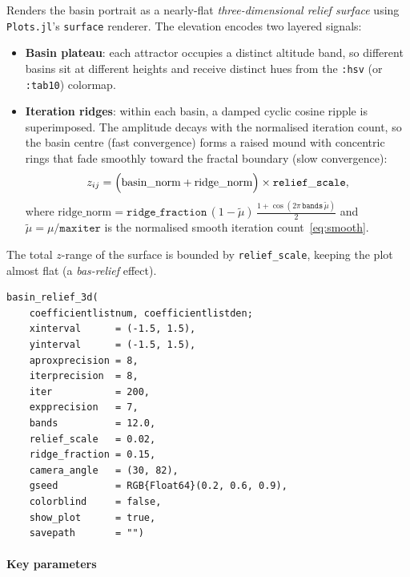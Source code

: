 \documentclass[11pt,a4paper]{article}
\theoremstyle{definition}
\newcommand{\pkg}[1]{\texttt{#1}}
\newcommand{\opt}[1]{\texttt{#1}}
\begin{document}
Renders the basin portrait as a nearly-flat \emph{three-dimensional relief
surface} using \pkg{Plots.jl}'s \texttt{surface} renderer.
The elevation encodes two layered signals:

\begin{itemize}[nosep]
  \item \textbf{Basin plateau}: each attractor occupies a distinct altitude
    band, so different basins sit at different heights and receive distinct
    hues from the \texttt{:hsv} (or \texttt{:tab10}) colormap.
  \item \textbf{Iteration ridges}: within each basin, a damped cyclic
    cosine ripple is superimposed.  The amplitude decays with the normalised
    iteration count, so the basin centre (fast convergence) forms a raised
    mound with concentric rings that fade smoothly toward the fractal
    boundary (slow convergence):
    \[
      z_{ij} = \Bigl(\text{basin\_norm} + \text{ridge\_norm}\Bigr)
               \times \mathtt{relief\_scale},
    \]
    where $\text{ridge\_norm} = \mathtt{ridge\_fraction}\,(1-\tilde\mu)\,
    \tfrac{1+\cos(2\pi\,\mathtt{bands}\,\tilde\mu)}{2}$
    and $\tilde\mu = \mu/\mathtt{maxiter}$ is the normalised smooth
    iteration count~\eqref{eq:smooth}.
\end{itemize}

The total $z$-range of the surface is bounded by \opt{relief\_scale},
keeping the plot almost flat (a \emph{bas-relief} effect).

\begin{lstlisting}
basin_relief_3d(
    coefficientlistnum, coefficientlistden;
    xinterval      = (-1.5, 1.5),
    yinterval      = (-1.5, 1.5),
    aproxprecision = 8,
    iterprecision  = 8,
    iter           = 200,
    expprecision   = 7,
    bands          = 12.0,
    relief_scale   = 0.02,
    ridge_fraction = 0.15,
    camera_angle   = (30, 82),
    gseed          = RGB{Float64}(0.2, 0.6, 0.9),
    colorblind     = false,
    show_plot      = true,
    savepath       = "")
\end{lstlisting}

\paragraph{Key parameters}
\end{document}

